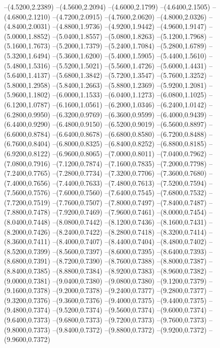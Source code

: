 {	--(4.5200,2.2389)
	--(4.5600,2.2094)
	--(4.6000,2.1799)
	--(4.6400,2.1505)
	--(4.6800,2.1210)
	--(4.7200,2.0915)
	--(4.7600,2.0620)
	--(4.8000,2.0326)
	--(4.8400,2.0031)
	--(4.8800,1.9736)
	--(4.9200,1.9442)
	--(4.9600,1.9147)
	--(5.0000,1.8852)
	--(5.0400,1.8557)
	--(5.0800,1.8263)
	--(5.1200,1.7968)
	--(5.1600,1.7673)
	--(5.2000,1.7379)
	--(5.2400,1.7084)
	--(5.2800,1.6789)
	--(5.3200,1.6494)
	--(5.3600,1.6200)
	--(5.4000,1.5905)
	--(5.4400,1.5610)
	--(5.4800,1.5316)
	--(5.5200,1.5021)
	--(5.5600,1.4726)
	--(5.6000,1.4431)
	--(5.6400,1.4137)
	--(5.6800,1.3842)
	--(5.7200,1.3547)
	--(5.7600,1.3252)
	--(5.8000,1.2958)
	--(5.8400,1.2663)
	--(5.8800,1.2369)
	--(5.9200,1.2081)
	--(5.9600,1.1802)
	--(6.0000,1.1533)
	--(6.0400,1.1273)
	--(6.0800,1.1025)
	--(6.1200,1.0787)
	--(6.1600,1.0561)
	--(6.2000,1.0346)
	--(6.2400,1.0142)
	--(6.2800,0.9950)
	--(6.3200,0.9769)
	--(6.3600,0.9599)
	--(6.4000,0.9439)
	--(6.4400,0.9290)
	--(6.4800,0.9150)
	--(6.5200,0.9019)
	--(6.5600,0.8897)
	--(6.6000,0.8784)
	--(6.6400,0.8678)
	--(6.6800,0.8580)
	--(6.7200,0.8488)
	--(6.7600,0.8404)
	--(6.8000,0.8325)
	--(6.8400,0.8252)
	--(6.8800,0.8185)
	--(6.9200,0.8122)
	--(6.9600,0.8065)
	--(7.0000,0.8011)
	--(7.0400,0.7962)
	--(7.0800,0.7916)
	--(7.1200,0.7874)
	--(7.1600,0.7835)
	--(7.2000,0.7798)
	--(7.2400,0.7765)
	--(7.2800,0.7734)
	--(7.3200,0.7706)
	--(7.3600,0.7680)
	--(7.4000,0.7656)
	--(7.4400,0.7633)
	--(7.4800,0.7613)
	--(7.5200,0.7594)
	--(7.5600,0.7576)
	--(7.6000,0.7560)
	--(7.6400,0.7545)
	--(7.6800,0.7532)
	--(7.7200,0.7519)
	--(7.7600,0.7507)
	--(7.8000,0.7497)
	--(7.8400,0.7487)
	--(7.8800,0.7478)
	--(7.9200,0.7469)
	--(7.9600,0.7461)
	--(8.0000,0.7454)
	--(8.0400,0.7448)
	--(8.0800,0.7442)
	--(8.1200,0.7436)
	--(8.1600,0.7431)
	--(8.2000,0.7426)
	--(8.2400,0.7422)
	--(8.2800,0.7418)
	--(8.3200,0.7414)
	--(8.3600,0.7411)
	--(8.4000,0.7407)
	--(8.4400,0.7404)
	--(8.4800,0.7402)
	--(8.5200,0.7399)
	--(8.5600,0.7397)
	--(8.6000,0.7395)
	--(8.6400,0.7393)
	--(8.6800,0.7391)
	--(8.7200,0.7390)
	--(8.7600,0.7388)
	--(8.8000,0.7387)
	--(8.8400,0.7385)
	--(8.8800,0.7384)
	--(8.9200,0.7383)
	--(8.9600,0.7382)
	--(9.0000,0.7381)
	--(9.0400,0.7380)
	--(9.0800,0.7380)
	--(9.1200,0.7379)
	--(9.1600,0.7378)
	--(9.2000,0.7378)
	--(9.2400,0.7377)
	--(9.2800,0.7377)
	--(9.3200,0.7376)
	--(9.3600,0.7376)
	--(9.4000,0.7375)
	--(9.4400,0.7375)
	--(9.4800,0.7374)
	--(9.5200,0.7374)
	--(9.5600,0.7374)
	--(9.6000,0.7374)
	--(9.6400,0.7373)
	--(9.6800,0.7373)
	--(9.7200,0.7373)
	--(9.7600,0.7373)
	--(9.8000,0.7373)
	--(9.8400,0.7372)
	--(9.8800,0.7372)
	--(9.9200,0.7372)
	--(9.9600,0.7372)
}
